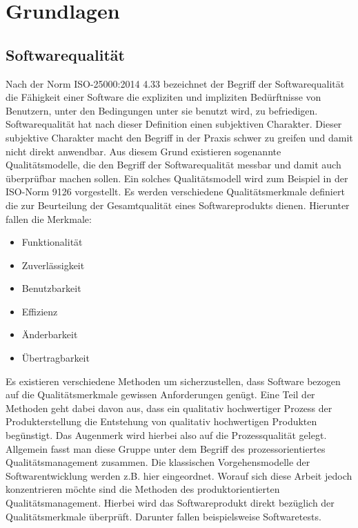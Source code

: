 \chapter{Grundlagen}
\label{sec:grundlagen}


\section{Softwarequalität}
\label{sec:softwarequalität}

Nach der Norm ISO-25000:2014 4.33 bezeichnet der Begriff der Softwarequalität die Fähigkeit einer Software die expliziten und impliziten Bedürftnisse von Benutzern, unter den Bedingungen unter sie benutzt wird, zu befriedigen.  \cite {international_organization_for_standardization_iso_so/iec_2014}
Softwarequalität hat nach dieser Definition einen subjektiven Charakter.
Dieser subjektive Charakter macht den Begriff in der Praxis schwer zu greifen und damit nicht direkt anwendbar. Aus diesem Grund existieren sogenannte Qualitätsmodelle, die den Begriff der Softwarequalität messbar und damit auch überprüfbar machen sollen.
Ein solches Qualitätsmodell wird zum Beispiel in der ISO-Norm 9126 vorgestellt. \cite{iso/iec_iso/iec_2001}
Es werden verschiedene Qualitätsmerkmale definiert die zur Beurteilung der Gesamtqualität eines Softwareprodukts dienen.
Hierunter fallen die Merkmale:

\begin{itemize}
	  \itemsep0pt
      \item Funktionalität
      \item Zuverlässigkeit
      \item Benutzbarkeit
      \item Effizienz
      \item Änderbarkeit
      \item Übertragbarkeit          
\end{itemize}

Es existieren verschiedene Methoden um sicherzustellen, dass Software bezogen auf die Qualitätsmerkmale gewissen Anforderungen genügt.
Eine Teil der Methoden geht dabei davon aus, dass ein qualitativ hochwertiger Prozess der Produkterstellung die Entstehung von qualitativ hochwertigen Produkten begünstigt.
Das Augenmerk wird hierbei also auf die Prozessqualität gelegt.
Allgemein fasst man diese Gruppe unter dem Begriff des prozessorientiertes Qualitätsmanagement zusammen. Die klassischen Vorgehensmodelle der Softwarentwicklung werden z.B. hier eingeordnet.
Worauf sich diese Arbeit jedoch konzentrieren möchte sind die Methoden des produktorientierten Qualitätsmanagement.
Hierbei wird das Softwareprodukt direkt bezüglich der Qualitätsmerkmale überprüft.
Darunter fallen beispielsweise Softwaretests.


